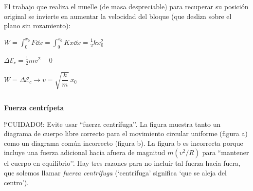 El trabajo que realiza el muelle (de masa despreciable) para recuperar su posición original se invierte en aumentar la velocidad del bloque (que desliza sobre el plano sin rozamiento):

$W=\displaystyle \int_0^{x_0} F \dd x=\int_0^{x_0} K x \dd x= \frac 1 2 k x_0^2$

$\Delta \mathcal E_c=\frac 1 2 m v^2 - 0$

$W=\Delta \mathcal E_c \to v=\displaystyle \sqrt{\dfrac k m }\ x_0$


\rule{150 pt}{0.4 pt}

\textbf{Fuerza centrípeta}

!`CUIDADO!: Evite usar ``fuerza centrífuga’’. La figura muestra tanto un diagrama de cuerpo libre correcto para el movimiento circular uniforme (figura a) como un diagrama común incorrecto (figura b). La figura b es incorrecta porque incluye una fuerza adicional hacia afuera de magnitud $m(v^2/R)$ para ``mantener el cuerpo en equilibrio’’. Hay tres razones para no incluir tal fuerza hacia fuera, que solemos llamar \textit{ fuerza centrífuga} (`centrífuga’ significa `que se aleja del centro’). 

